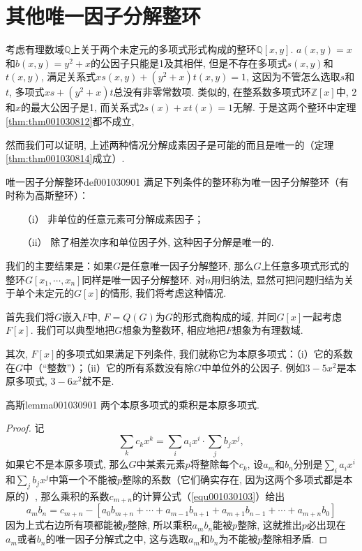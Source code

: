 \section{其他唯一因子分解整环}\label{subsection0010309}
考虑有理数域$\mathbb{Q}$上关于两个未定元的多项式形式构成的整环$\mathbb{Q}[x, y]$. $a(x,y) = x$和$b(x,y)=y^2+x$的公因子只能是1及其相伴, 但是不存在多项式$s(x,y)$和$t(x,y)$, 满足关系式$xs(x,y)+(y^2+x)t(x,y)=1$, 这因为不管怎么选取$s$和$t$, 多项式$xs+(y^2+x)t$总没有非零常数项. 类似的, 在整系数多项式环$\mathbb{Z}[x]$中, $2$和$x$的最大公因子是1, 而关系式$2s(x)+xt(x)=1$无解. 于是这两个整环中定理\ref{thm:thm001030812}都不成立, 

然而我们可以证明, 上述两种情况分解成素因子是可能的而且是唯一的（定理\ref{thm:thm001030814}成立）. 
\begin{definition}{唯一因子分解整环}{def001030901}
满足下列条件的整环称为唯一因子分解整环（有时称为高斯整环）：
\begin{enumerate}
\item[（i）] 非单位的任意元素可分解成素因子；
\item[（ii）] 除了相差次序和单位因子外, 这种因子分解是唯一的. 
\end{enumerate}
\end{definition}

我们的主要结果是：如果$G$是任意唯一因子分解整环, 那么$G$上任意多项式形式的整环$G[x_1, \cdots, x_n]$同样是唯一因子分解整环. 对$n$用归纳法, 显然可把问题归结为关于单个未定元的$G[x]$的情形, 我们将考虑这种情况. 

首先我们将$G$嵌入$F$中, $F=Q(G)$为$G$的形式商构成的域, 并同$G[x]$一起考虑$F[x]$. 我们可以典型地把$G$想象为整数环, 相应地把$F$想象为有理数域. 

其次, $F[x]$的多项式如果满足下列条件, 我们就称它为本原多项式：（i）它的系数在$G$中（“整数”）；（ii）它的所有系数没有除$G$中单位外的公因子. 例如$3-5x^2$是本原多项式, $3-6x^2$就不是. 

\begin{lemma}{高斯}{lemma001030901}
两个本原多项式的乘积是本原多项式. 
\end{lemma}

\begin{proof}
记
\[
\sum_{k}{c_kx^k} = \sum_{i}{a_ix^i} \cdot \sum_{j}{b_jx^j},
\]
如果它不是本原多项式, 那么$G$中某素元素$p$将整除每个$c_k$, 设$a_m$和$b_n$分别是$\sum_{i}{a_ix^i}$和$\sum_{j}{b_jx^j}$中第一个不能被$p$整除的系数（它们确实存在, 因为这两个多项式都是本原的）, 那么乘积的系数$c_{m+n}$的计算公式（\ref{equ001030103}）给出
\[
a_mb_n=c_{m+n} - [a_0b_{m+n} + \cdots+a_{m-1}b_{n+1} + a_{m+1}b_{n-1} + \cdots+a_{m+n}b_0]
\]
因为上式右边所有项都能被$p$整除, 所以乘积$a_mb_n$能被$p$整除, 这就推出$p$必出现在$a_m$或者$b_n$的唯一因子分解式之中, 这与选取$a_m$和$b_n$为不能被$p$整除相矛盾. 
\end{proof}


